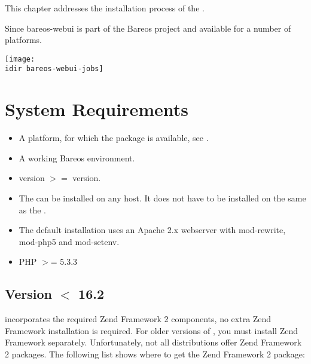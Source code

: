 
This chapter addresses the installation process of the \bareosWebui.

Since  bareos-webui is part of the Bareos project and available for a number of platforms.

\begin{center}
  \texttt{[image: \\idir bareos-webui-jobs]}
\end{center}

\section{System Requirements}

\begin{itemize}
\item A platform, for which the  package is available, see .
\item A working Bareos environment.
\item \bareosDir version $>=$ \bareosWebui version.
\item The \bareosWebui can be installed on any host. It does not have to be installed on the same as the \bareosDir.
\item The default installation uses an Apache 2.x webserver with mod-rewrite, mod-php5 and mod-setenv.
\item PHP $>$= 5.3.3
\end{itemize}

\subsection{Version $<$ 16.2}

\bareosWebui {} incorporates the required Zend Framework 2 components, no extra Zend Framework installation is required.
For older versions of , you must install Zend Framework separately.
Unfortunately, not all distributions offer Zend Framework 2 packages.
The following list shows where to get the Zend Framework 2 package:

